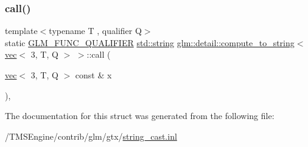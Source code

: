 \subsubsection{\texorpdfstring{call()}{call()}}
{\footnotesize\ttfamily template$<$typename T , qualifier Q$>$ \\
static \hyperlink{setup_8hpp_a33fdea6f91c5f834105f7415e2a64407}{G\+L\+M\+\_\+\+F\+U\+N\+C\+\_\+\+Q\+U\+A\+L\+I\+F\+I\+ER} \hyperlink{_s_d_l__opengl__glext_8h_ae84541b4f3d8e1ea24ec0f466a8c568b}{std\+::string} \hyperlink{structglm_1_1detail_1_1compute__to__string}{glm\+::detail\+::compute\+\_\+to\+\_\+string}$<$ \hyperlink{structglm_1_1vec}{vec}$<$ 3, T, Q $>$ $>$\+::call (\begin{DoxyParamCaption}\item[{\hyperlink{structglm_1_1vec}{vec}$<$ 3, T, Q $>$ const \&}]{x }\end{DoxyParamCaption})\hspace{0.3cm}{\ttfamily [inline]}, {\ttfamily [static]}}



The documentation for this struct was generated from the following file\+:\begin{DoxyCompactItemize}
\item 
/\+T\+M\+S\+Engine/contrib/glm/gtx/\hyperlink{string__cast_8inl}{string\+\_\+cast.\+inl}\end{DoxyCompactItemize}
